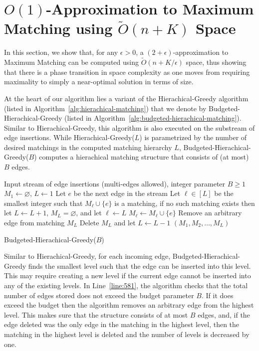 \documentclass[11pt,a4paper]{article}
\begin{document}
\section{$O(1)$-Approximation to \textsf{Maximum Matching} using $\tilde{O}(n + K)$ Space} \label{sec:maximum-matching}

In this section, we show that, for any $\epsilon > 0$, a $(2+\epsilon)$-approximation to \textsf{Maximum Matching} can be computed using $\tilde{O}(n+K/\epsilon)$ space, thus showing that there is a phase transition in space complexity as one moves from requiring maximality to simply a near-optimal solution in terms of size.

At the heart of our algorithm lies a variant of the \textsf{Hierachical-Greedy} algorithm (listed in Algorithm~\ref{alg:hierachical-matching}) that we denote by \textsf{Budgeted-Hierachical-Greedy} (listed in Algorithm~\ref{alg:budgeted-hierachical-matching}). Similar to \textsf{Hierachical-Greedy}, this algorithm is also executed on the substream of edge insertions. While \textsf{Hierachical-Greedy($L$)} is parametrized by the number of desired matchings in the computed matching hierarchy $L$, \textsf{Budgeted-Hierachical-Greedy($B$)} computes a hierachical matching structure that consists of  (at most) $B$ edges.

\begin{algorithm}
    \begin{algorithmic}[1]
        \REQUIRE Input stream of edge insertions (multi-edges allowed), integer parameter $B \ge 1$
        \STATE $M_1 \gets \varnothing$, $L \gets 1$
            \STATE Let $e$ be the next edge in the stream
            \STATE Let $\ell \in [L]$ be the smallest integer such that $M_{\ell} \cup \{e\}$ is a matching, if no such matching exists then let $L \gets L+1$, $M_L = \varnothing$, and let $\ell \gets L$
            \STATE $M_{\ell} \gets M_{\ell} \cup \{e\}$
             \label{line:581}
                \STATE Remove an arbitrary edge from matching $M_L$
                    \STATE Delete $M_L$ and let $L \gets L - 1$
                \ENDIF
            \ENDIF
        \ENDWHILE
        \RETURN $(M_1, M_2, \dots, M_{L})$
    \end{algorithmic}
    \caption{\textsf{Budgeted-Hierachical-Greedy($B$)}  \label{alg:budgeted-hierachical-matching}}
\end{algorithm}

Similar to \textsf{Hierachical-Greedy}, for each incoming edge, \textsf{Budgeted-Hierachical-Greedy} finds the smallest level such that the edge can be inserted into this level. This may require creating a new level if the current edge cannot be inserted into any of the existing levels. In Line~\ref{line:581}, the algorithm checks that the total number of edges stored does not exceed the budget parameter $B$. If it does exceed the budget then the algorithm removes an arbitrary edge from the highest level. This makes sure that the structure consists of at most $B$ edges, and, if the edge deleted was the only edge in the matching in the highest level, then the matching in the highest level is deleted and the number of levels is decreased by one.
\end{document}
